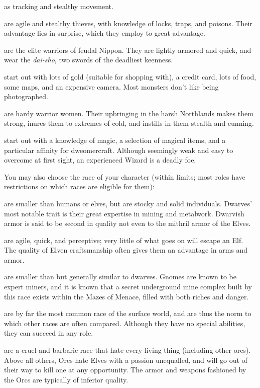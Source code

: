 as tracking and stealthy movement.
%
\item[\bb{Rogues}]%
are agile and stealthy thieves, with knowledge of locks,
traps, and poisons.  Their advantage lies in surprise, which they employ
to great advantage.
%
\item[\bb{Samurai}]%
are the elite warriors of feudal Nippon.  They are lightly
armored and quick, and wear the %
{\it dai-sho}, two swords of the deadliest
keenness.
%
\item[\bb{Tourists}]%
start out with lots of gold (suitable for shopping with),
a credit card, lots of food, some maps, and an expensive camera.  Most
monsters don't like being photographed.
%
\item[\bb{Valkyries}]%
are hardy warrior women.  Their upbringing in the harsh
Northlands makes them strong, inures them to extremes of cold, and instills
in them stealth and cunning.
%
\item[\bb{Wizards}]%
start out with a knowledge of magic, a selection of magical
items, and a particular affinity for dweomercraft.  Although seemingly weak
and easy to overcome at first sight, an experienced Wizard is a deadly foe.
\elist

You may also choose the race of your character (within limits; most
roles have restrictions on which races are eligible for them):

%
\blist{}
\item[\bb{Dwarves}]%
are smaller than humans or elves, but are stocky and solid
individuals.  Dwarves' most notable trait is their great expertise in mining
and metalwork.  Dwarvish armor is said to be second in quality not even to the
mithril armor of the Elves.
%
\item[\bb{Elves}]%
are agile, quick, and perceptive; very little of what goes
on will escape an Elf.  The quality of Elven craftsmanship often gives
them an advantage in arms and armor.
%
\item[\bb{Gnomes}]%
are smaller than but generally similar to dwarves.  Gnomes are
known to be expert miners, and it is known that a secret underground mine
complex built by this race exists within the Mazes of Menace, filled with
both riches and danger.
%
\item[\bb{Humans}]%
are by far the most common race of the surface world, and
are thus the norm to which other races are often compared.  Although
they have no special abilities, they can succeed in any role.
%
\item[\bb{Orcs}]%
are a cruel and barbaric race that hate every living thing
(including other orcs).  Above all others, Orcs hate Elves with a passion
unequalled, and will go out of their way to kill one at any opportunity.
The armor and weapons fashioned by the Orcs are typically of inferior quality.
\elist

